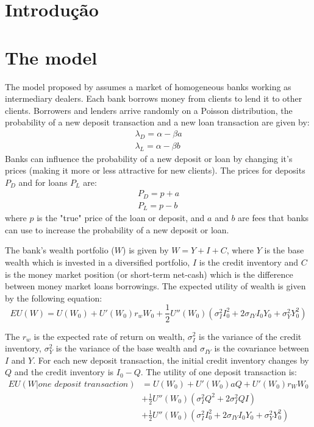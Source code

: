 \chapter{Introdução}


\chapter{The model}\label{cap_trabalho_academico}

The model proposed by  assumes a market of homogeneous banks working as intermediary dealers. Each bank borrows money from clients to lend it to other clients. Borrowers and lenders arrive randomly on a Poisson distribution, the probability of a new deposit transaction and a new loan transaction are given by: 
\begin{align}
  \lambda_D = \alpha - \beta a \\
  \lambda_L = \alpha - \beta b
\end{align} 
Banks can influence the probability of a new deposit or loan by changing it's prices (making it more or less attractive for new clients). The prices for deposits $P_D$ and for loans $P_L$ are:
\begin{align}
  P_D = p+a \\
  P_L = p-b 
\end{align}
where $p$ is the "true" price of the loan or deposit, and $a$ and $b$ are fees that banks can use to increase the probability of a new deposit or loan.

The bank's wealth portfolio ($W$) is given by $W = Y + I + C$, where $Y$ is the base wealth which is invested in a diversified portfolio, $I$ is the credit inventory and $C$ is the money market position (or short-term net-cash) which is the difference between money market loans borrowings. The expected utility of wealth is given by the following equation:
\begin{equation}
  EU(W) = U(W_0) + U'(W_0)r_w W_0 + \frac{1}{2}U''(W_0)(\sigma_I^2 I_0^2 + 2\sigma_{IY} I_0 Y_0 + \sigma_Y^2 Y_0^2)
\end{equation}

The $r_w$ is the expected rate of return on wealth, $\sigma_I^2$ is the variance of the credit inventory, $\sigma_Y^2$ is the variance of the base wealth and $\sigma_{IY}$ is the covariance between $I$ and $Y$. For each new deposit transaction, the initial credit inventory changes by $Q$ and the credit inventory is $I_0 - Q$. The utility of one deposit transaction is:
\begin{equation}
  \begin{aligned}
    EU(W|\textit{one deposit transaction}) &= U(W_0) + U'(W_0)aQ +  U'(W_0)r_W W_0 \\ &+ \frac{1}{2}U''(W_0)(\sigma_I^2 Q^2 + 2\sigma_I^2 QI) \\ &+\frac{1}{2}U''(W_0)(\sigma_I^2 I_0^2 + 2\sigma_{IY} I_0 Y_0 + \sigma_Y^2 Y_0^2)
  \end{aligned}
\end{equation}


